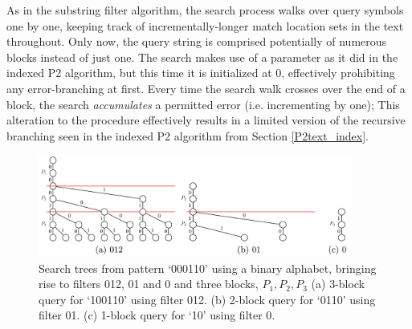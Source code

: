 As in the substring filter algorithm, the search process walks over query symbols one by one, keeping track of incrementally-longer \gls{match location} sets in the text throughout. Only now, the query string is comprised potentially of numerous blocks instead of just one. The search makes use of a parameter  as it did in the indexed P2 algorithm, but this time it is initialized at $0$, effectively prohibiting any error-branching at first. Every time the search walk crosses over the end of a block, the search \textit{accumulates} a permitted error (i.e. incrementing  by one); This alteration to the procedure effectively results in a limited version of the recursive branching seen in the indexed P2 algorithm from Section \ref{P2text_index}.

\begin{figure}[!htb]
\centering
\includegraphics[width=0.92\textwidth]{images/trie.png}

\caption[Search trees from pattern `000110' using a binary alphabet, bringing rise to filters 012, 01 and 0 and three blocks, $P_1, P_2, P_3$]{Search trees\protect{}\footnotemark{} from pattern `000110' using a binary alphabet, bringing rise to filters 012, 01 and 0 and three blocks, $P_1, P_2, P_3$ (a) 3-block query for `100110' using filter 012. (b) 2-block query for `0110' using filter 01. (c) 1-block query for `10' using filter 0.}
\label{fig:filter_search}

\end{figure}
\FloatBarrier
{}

 
